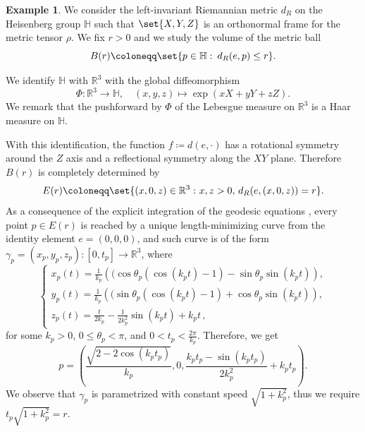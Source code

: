 \documentclass[a4paper,11pt,reqno]{amsart}
\theoremstyle{plain}
\theoremstyle{definition}
\newtheorem{example}[theorem]{Example}
\newcommand{\R}{\mathbb R}
\renewcommand{\H}{\mathbb H}
\newcommand{\g}{\mathfrak{g}}
\newcommand{\coloneq}{\coloneqq}
\begin{document}
 \begin{example}
 We consider the left-invariant Riemannian metric $d_R$ on the Heisenberg group $\H$ such that $\set{X,Y,Z}$ is an orthonormal frame for the metric tensor $\rho$. We fix $r > 0$ and we study the volume of the metric ball
 \begin{equation*}
 B(r) \coloneq \set{ p \in \H \, \colon \, d_R(e,p) \le r}.
 \end{equation*}
 
 We identify $\H$ with $\R^3$ with the global diffeomorphism
 \begin{equation*}
 \Phi \colon \R^3 \to \H, \quad (x,y,z) \mapsto \exp(xX + yY + zZ).
 \end{equation*}
 We remark that the pushforward by $\Phi$ of the Lebesgue measure on $\R^3$ is a Haar measure on $\H$.
 
 With this identification, the function $f \coloneq d(e,\cdot)$ has a rotational symmetry around the $Z$ axis and a reflectional symmetry along the $XY$ plane. Therefore $B(r)$ is completely determined by 
 \begin{equation*}
 E(r) \coloneq \set{(x,0,z) \in \R^3 \, \colon x,z>0, \, d_R(e,(x,0,z))=r}.
 \end{equation*}
 As a consequence of the explicit integration of the geodesic equations \cite[Proposition 5.4]{MR3673666}, every point $p \in E(r)$ is reached by a unique length-minimizing curve from the identity element $e=(0,0,0)$, and such curve is of the form $\gamma_p =(x_p,y_p,z_p) \colon [0,t_p] \to \R^3$, where
 \begin{equation*}
 \begin{cases}
 x_p(t)=\frac{1}{k_p}\left((\cos \theta_p(\cos(k_pt)-1) - \sin \theta_p \sin(k_pt)\right) ,\\
 y_p(t)=\frac{1}{k_p}\left((\sin \theta_p(\cos(k_pt)-1) + \cos \theta_p \sin(k_pt)\right) ,\\
 z_p(t)= \frac{t}{2k_p}-\frac{1}{2k_p^2}\sin(k_pt)+k_pt \,,
 \end{cases}
 \end{equation*}
 for some $k_p>0$, $0 \le \theta_p < \pi$, and $0 < t_p < \frac{2\pi}{k_p}$. Therefore, we get
 \begin{equation*}
 p = \left(\frac{\sqrt{2-2\cos(k_pt_p)}}{k_p}, 0, \frac{k_pt_p - \sin(k_pt_p)}{2k_p^2}+k_pt_p\right).
 \end{equation*}
We observe that $\gamma_p$ is parametrized with constant speed $\sqrt{1+k_p^2}$, thus we require $t_p\sqrt{1+k_p^2}=r$.


\end{example}
\end{document}
